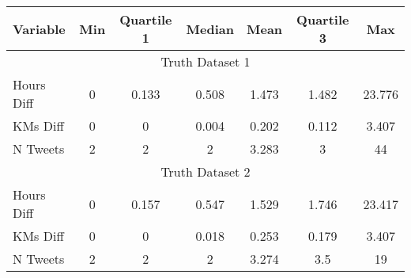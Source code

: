 \begin{tabular}{lcccccc} \hline Variable & Min & Quartile 1 & Median & Mean & Quartile 3 & Max \\ \hline \multicolumn{7}{c}{Truth Dataset 1} \\ Hours Diff  & 0  & 0.133  & 0.508  & 1.473  & 1.482  & 23.776  \\ KMs Diff  & 0  & 0  & 0.004  & 0.202  & 0.112  & 3.407  \\ N Tweets  & 2  & 2  & 2  & 3.283  & 3  & 44  \\ \hline \multicolumn{7}{c}{Truth Dataset 2} \\ Hours Diff  & 0  & 0.157  & 0.547  & 1.529  & 1.746  & 23.417  \\ KMs Diff  & 0  & 0  & 0.018  & 0.253  & 0.179  & 3.407  \\ N Tweets  & 2  & 2  & 2  & 3.274  & 3.5  & 19  \\ \hline \end{tabular} 